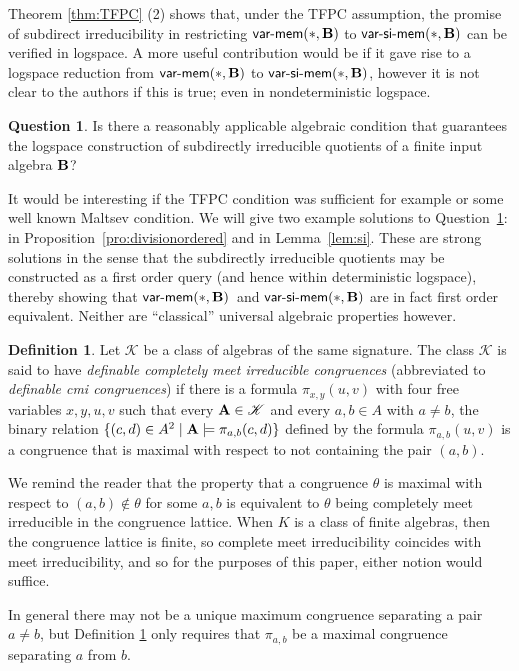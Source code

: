 \documentclass[reqno]{amsart}
\theoremstyle{plain}
\theoremstyle{definition}
\newtheorem{defn}[thm]{Definition}
\newtheorem{question}[thm]{Question}
\newcommand{\varmem}{\textsf{var-mem}}
\newcommand{\varsimem}{\textsf{var-si-mem}}
\newcommand{\up}[1]{\textup{#1}}
\begin{document}
Theorem \ref{thm:TFPC} (2) shows that, under the TFPC assumption,  the promise of subdirect irreducibility in restricting $\varmem(*,{\bf B})$ to $\varsimem(*,{\bf B})$ can be verified in logspace.  
A more useful contribution would be if it gave rise to a logspace reduction from $\varmem(*,{\bf B})$ to $\varsimem(*,{\bf B})$, however it is not clear to the authors if this is true; even in nondeterministic logspace.  
\begin{question}\label{question:logspacesi}
Is there a reasonably applicable algebraic condition that guarantees the logspace construction of subdirectly irreducible quotients of a finite input algebra ${\bf B}$? 
\end{question}
It would be interesting if the TFPC condition was sufficient for example or some well known Maltsev condition.  
We will give two example solutions to Question~\ref{question:logspacesi}: in Proposition~\ref{pro:divisionordered} and in Lemma~\ref{lem:si}.  
These are strong solutions in the sense that the subdirectly irreducible quotients may be constructed as a first order query (and hence within deterministic logspace), thereby showing that $\varmem(*,{\bf B})$\ and $\varsimem(*,{\bf B})$ are in fact first order equivalent.  
Neither are ``classical'' universal algebraic properties however.
\begin{defn}\label{defn:cmi}
Let $\mathscr{K}$ be a class of  algebras of the same signature.  The class $\mathscr{K}$ is said to have \emph{definable completely meet irreducible congruences} \up(abbreviated to \emph{definable cmi congruences}\up) if there is a formula $\pi_{x,y}(u,v)$ with four free variables $x,y,u,v$ such that every ${\bf A}\in \mathscr{K}$ and every $a,b\in A$ with $a\neq b$, the binary relation $\{(c,d)\in A^2\mid {\bf A}\models \pi_{a,b}(c,d)\}$ defined by the formula $\pi_{a,b}(u,v)$ is a congruence that is maximal with respect to not containing the pair $(a,b)$.
\end{defn}
We remind the reader that the property that a congruence $\theta$ is maximal with respect to $(a,b)\notin\theta$ for some $a,b$ is equivalent to $\theta$ being completely meet irreducible in the congruence lattice.  When $K$ is a class of finite algebras, then the congruence lattice is finite, so complete meet irreducibility coincides with meet irreducibility, and so for the purposes of this paper, either notion would suffice.

In general there may not be a unique maximum congruence separating a pair $a\neq b$, but Definition \ref{defn:cmi} only requires that $\pi_{a,b}$ be a maximal congruence separating $a$ from $b$.  
\end{document}
